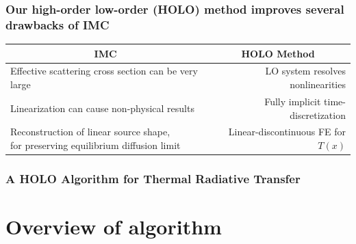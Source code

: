 \documentclass[xcolor=dvipsnames,hyperref={pdfpagelabels=false},unknownkeysallowed]{beamer}
\newcommand{\colb}[1]{{\color{blue} #1}}
\newcommand{\shorttitle}{\color{black} A HOLO Algorithm for Thermal Radiative Transfer}
\begin{document}
\begin{frame}
    \frametitle{Our high-order low-order (HOLO) method improves several drawbacks of IMC}
{\scriptsize
\begin{tabular}{lr} \hline
\multicolumn{1}{c}{\textbf{IMC}} & \multicolumn{1}{c}{\colb{HOLO Method}} \\  \hline
Effective scattering cross section can be very large & LO system resolves nonlinearities \\
Linearization can cause non-physical results & Fully implicit time-discretization \\
\parbox{0.4\textwidth}{Reconstruction of linear source shape,\\ for preserving equilibrium diffusion limit} & Linear-discontinuous FE for $T(x)$
\end{tabular}
}
\end{frame}

\begin{frame}
    \frametitle{\shorttitle}
\begin{minipage}{0.061\linewidth}
\hfill                      
\end{minipage}
\begin{minipage}{0.8\linewidth}
\tableofcontents[
hideothersubsections,
sectionstyle=show,
subsectionstyle=hide
]
\end{minipage}

\end{frame}
\section{Overview of algorithm}
\end{document}
